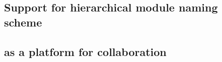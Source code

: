 
\subsection{Support for hierarchical module naming scheme}

\cite{EasyBuildSC12} \cite{Dubois03} \cite{swtools} \cite{jones08}

\subsection{\easybuild{} as a platform for collaboration}
